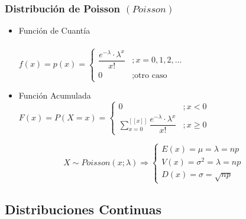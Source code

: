 \documentclass[10pt,letterpaper]{article}
\begin{document}
\subsubsection{Distribución de Poisson $(Poisson)$}
\begin{multicols}{2}
\begin{itemize}
\item Función de Cuantía \\ \vspace{0.025cm} \\
$f(x)=p(x)=
\begin{cases}
\dfrac{e^{-\lambda} \cdot \lambda^x}{x!} &; x=0,1,2,\ldots \\
0 &; \text{otro caso}
\end{cases}$
\end{itemize}
\columnbreak
\begin{itemize}
\item Función Acumulada \\
$F(x)=P(X=x)=
\begin{cases}
0 &; x<0 \\
\displaystyle\sum_{x=0}^{[\![ x ]\!]} \dfrac{e^{-\lambda} \cdot \lambda^x}{x!} &; x \geq 0
\end{cases}$
\end{itemize}
\end{multicols}
$$
X\sim Poisson(x;\lambda)\Rightarrow 
\begin{cases}
E(x)=\mu = \lambda = np \\
V(x)=\sigma^2 = \lambda = np\\
D(x)=\sigma=\sqrt{np}
\end{cases}
$$
\subsection{Distribuciones Continuas}
\end{document}
